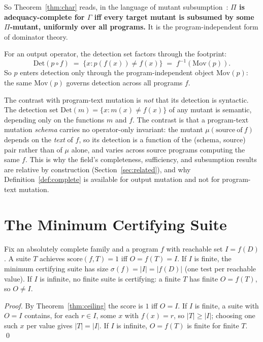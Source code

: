 \documentclass[runningheads,envcountsect,envcountsame]{llncs}
\newcommand{\Mov}{\mathrm{Mov}}
\newcommand{\Det}{\mathrm{Det}}
\newcommand{\score}{\mathrm{score}}
\begin{document}
So Theorem~\ref{thm:char} reads, in the language of mutant
subsumption~\cite{kurtz2015,ammann2014}: \textbf{$\Pi$ is adequacy-complete for
$\Gamma$ iff every target mutant is subsumed by some $\Pi$-mutant, uniformly over
all programs.} It is the program-independent form of dominator theory.

\begin{proposition}
\label{prop:factor}
For an output operator, the detection set factors through the footprint:
\[
  \Det(p \circ f) \;=\; \{x : p(f(x)) \neq f(x)\} \;=\; f^{-1}(\Mov(p)).
\]
So $p$ enters detection only through the program-independent object $\Mov(p)$:
the same $\Mov(p)$ governs detection across all programs $f$.
\end{proposition}

The contrast with program-text mutation is \emph{not} that its detection is
syntactic. The detection set $\Det(m) = \{x : m(x) \neq f(x)\}$ of any mutant is
semantic, depending only on the functions $m$ and $f$. The contrast is that a
program-text mutation \emph{schema} carries no operator-only invariant: the
mutant $\mu(\mathrm{source\ of\ } f)$ depends on the \emph{text} of $f$, so its
detection is a function of the (schema, source) pair rather than of $\mu$ alone,
and varies across source programs computing the same $f$. This is why the field's
completeness, sufficiency, and subsumption results are relative by construction
(Section~\ref{sec:related}), and why Definition~\ref{def:complete} is available
for output mutation and not for program-text mutation.

\section{The Minimum Certifying Suite}
\label{sec:suite}

\begin{theorem}
\label{thm:suite}
Fix an absolutely complete family and a program $f$ with reachable set $I =
f(D)$. A suite $T$ achieves $\score(f,T) = 1$ iff $O = f(T) = I$. If $I$ is
finite, the minimum certifying suite has size $\sigma(f) = |I| = |f(D)|$ (one
test per reachable value). If $I$ is infinite, no finite suite is certifying: a
finite $T$ has finite $O = f(T)$, so $O \neq I$.
\end{theorem}

\begin{proof}
By Theorem~\ref{thm:ceiling} the score is $1$ iff $O = I$. If $I$ is finite, a
suite with $O = I$ contains, for each $r \in I$, some $x$ with $f(x) = r$, so
$|T| \ge |I|$; choosing one such $x$ per value gives $|T| = |I|$. If $I$ is
infinite, $O = f(T)$ is finite for finite $T$. \qed
\end{proof}
\end{document}

